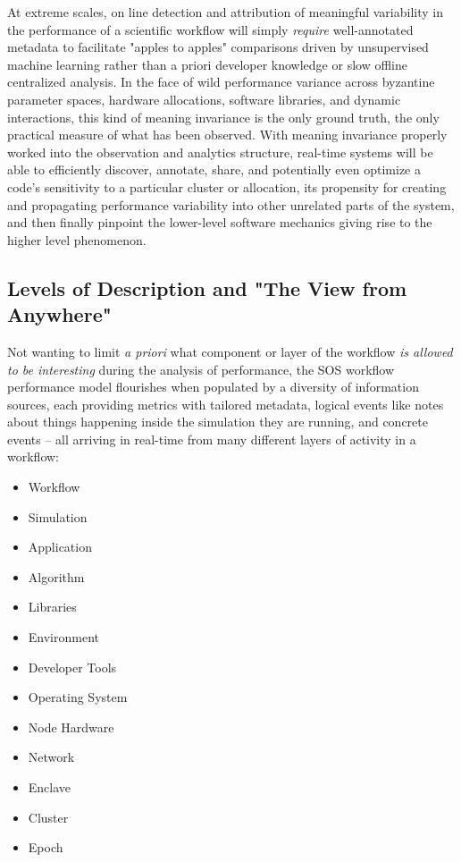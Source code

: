 At extreme scales, on line detection and attribution of meaningful
variability in the performance of a scientific workflow will simply
\textit{require} well-annotated metadata to facilitate "apples to
apples" comparisons driven by unsupervised machine learning rather
than a priori developer knowledge or slow offline centralized
analysis. In the face of wild performance variance across byzantine
parameter spaces, hardware allocations, software libraries, and
dynamic interactions, this kind of meaning invariance is the only
ground truth, the only practical measure of what has been
observed. With meaning invariance properly worked into the observation
and analytics structure, real-time systems will be able to efficiently
discover, annotate, share, and potentially even optimize a code's
sensitivity to a particular cluster or allocation, its propensity for
creating and propagating performance variability into other unrelated
parts of the system, and then finally pinpoint the lower-level
software mechanics giving rise to the higher level phenomenon.


\subsection{Levels of Description and "The View from Anywhere"}
Not wanting to limit \textit{a priori} what component or layer of the
workflow \textit{is allowed to be interesting} during the analysis of
performance, the SOS workflow performance model flourishes when
populated by a diversity of information sources, each providing
metrics with tailored metadata, logical events like notes about things
happening inside the simulation they are running, and concrete events
-- all arriving in real-time from many different layers of activity in
a workflow:
\begin{itemize}
    \item Workflow
    \item Simulation
    \item Application
    \item Algorithm
    \item Libraries
    \item Environment
    \item Developer Tools
    \item Operating System
    \item Node Hardware
    \item Network
    \item Enclave
    \item Cluster
    \item Epoch	
\end{itemize}

